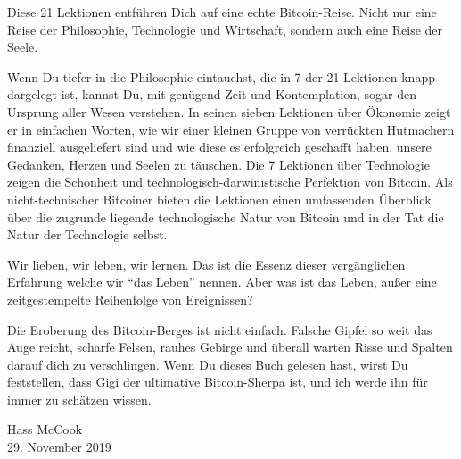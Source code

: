 Diese 21 Lektionen entführen Dich auf eine echte Bitcoin-Reise. Nicht nur eine
Reise der Philosophie, Technologie und Wirtschaft, sondern auch eine Reise der
Seele.

Wenn Du tiefer in die Philosophie eintauchst, die in 7 der 21 Lektionen knapp
dargelegt ist, kannst Du, mit genügend Zeit und Kontemplation, sogar den
Ursprung aller Wesen verstehen. In seinen sieben Lektionen über Ökonomie zeigt
er in einfachen Worten, wie wir einer kleinen Gruppe von verrückten Hutmachern
finanziell ausgeliefert sind und wie diese es erfolgreich geschafft haben,
unsere Gedanken, Herzen und Seelen zu täuschen. Die 7 Lektionen über Technologie
zeigen die Schönheit und technologisch-darwinistische Perfektion von Bitcoin.
Als nicht-technischer Bitcoiner bieten die Lektionen einen umfassenden Überblick
über die zugrunde liegende technologische Natur von Bitcoin und in der Tat die
Natur der Technologie selbst.

Wir lieben, wir leben, wir lernen. Das ist die Essenz dieser vergänglichen
Erfahrung welche wir \enquote{das Leben} nennen. Aber was ist das Leben, außer
eine zeitgestempelte Reihenfolge von Ereignissen?

Die Eroberung des Bitcoin-Berges ist nicht einfach. Falsche Gipfel so weit das
Auge reicht, scharfe Felsen, rauhes Gebirge und überall warten Risse und Spalten
darauf dich zu verschlingen. Wenn Du dieses Buch gelesen hast, wirst Du
feststellen, dass Gigi der ultimative Bitcoin-Sherpa ist, und ich werde ihn für
immer zu schätzen wissen.

\begin{flushright}
  Hass McCook \\
  29. November 2019
\end{flushright}
